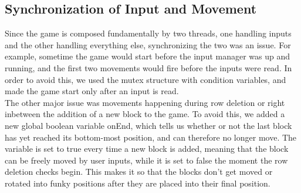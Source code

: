 	\subsection{Synchronization of Input and Movement}
		Since the game is composed fundamentally by two threads, one handling inputs and the other handling everything else, synchronizing the two was an issue. For example, sometime the game would start
		before the input manager was up and running, and the first two movements would fire before the inputs were read. In order to avoid this, we used the mutex structure with condition variables, and made
		the game start only after an input is read. \\
		The other major issue was movements happening during row deletion or right inbetween the addition of a new block to the game. To avoid this, we added a new global boolean variable onEnd, which tells us
		whether or not the last block has yet reached its bottom-most position, and can therefore no longer move. The variable is set to true every time a new block is added, meaning that the block can be freely
		moved by user inputs, while it is set to false the moment the row deletion checks begin. This makes it so that the blocks don't get moved or rotated into funky positions after they are placed into their 
		final position.
